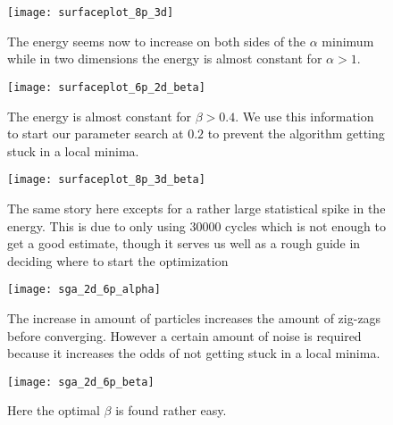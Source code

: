 \begin{figure}[!p]
  \begin{center}
    \texttt{[image: surfaceplot\_8p\_3d]}
  \end{center}
  \caption{The energy seems now to increase on both sides of the $\alpha$ minimum while in two dimensions the energy is almost constant for $\alpha>1$.}
  \label{fig:surfaceplot_8p_3d}
\end{figure}

\clearpage

\begin{figure}[!p]
  \begin{center}
    \texttt{[image: surfaceplot\_6p\_2d\_beta]}
  \end{center}
  \caption{The energy is almost constant for $\beta>0.4$. We use this information to start our parameter search at $0.2$ to prevent the algorithm getting stuck in a local minima.}
\label{fig:surfaceplot_6p_2d_beta}
\end{figure}

\begin{figure}[!p]
  \begin{center}
    \texttt{[image: surfaceplot\_8p\_3d\_beta]}
  \end{center}
  \caption{The same story here excepts for a rather large statistical spike in the energy. This is due to only using 30000 cycles which is not enough to get a good estimate, though it serves us well as a rough guide in deciding where to start the optimization}
  \label{fig:surfaceplot_8p_3d_beta}
\end{figure}

\clearpage

\begin{figure}[!p]
  \begin{center}
    \texttt{[image: sga\_2d\_6p\_alpha]}
  \end{center}
  \caption{The increase in amount of particles increases the amount of zig-zags before converging. However a certain amount of noise is required because it increases the odds of not getting stuck in a local minima.}
  \label{fig:sga_2d_6p_alpha}
\end{figure}

\begin{figure}[!p]
  \begin{center}
    \texttt{[image: sga\_2d\_6p\_beta]}
  \end{center}
  \caption{Here the optimal $\beta$ is found rather easy.}
\label{fig:sga_2d_6p_beta}
\end{figure}

